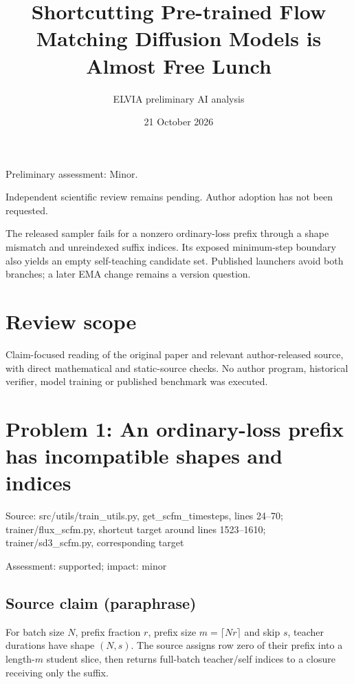 \documentclass[11pt]{article}
\begin{document}
\title{Shortcutting Pre-trained Flow Matching Diffusion Models is Almost Free Lunch}

\author{ELVIA preliminary AI analysis}\date{21 October 2026}\maketitle

Preliminary assessment: Minor.\par

Independent scientific review remains pending. Author adoption has not been requested.

The released sampler fails for a nonzero ordinary-loss prefix through a shape mismatch and unreindexed suffix indices. Its exposed minimum-step boundary also yields an empty self-teaching candidate set. Published launchers avoid both branches; a later EMA change remains a version question.

\section*{Review scope}

Claim-focused reading of the original paper and relevant author-released source, with direct mathematical and static-source checks. No author program, historical verifier, model training or published benchmark was executed.

\section*{Problem 1: An ordinary-loss prefix has incompatible shapes and indices}

Source: src/utils/train\_utils.py, get\_scfm\_timesteps, lines 24–70; trainer/flux\_scfm.py, shortcut target around lines 1523–1610; trainer/sd3\_scfm.py, corresponding target

Assessment: supported; impact: minor

\subsection*{Source claim (paraphrase)}

For batch size \(N\), prefix fraction \(r\), prefix size \(m=\lceil Nr\rceil\) and skip \(s\), teacher durations have shape \((N,s)\). The source assigns row zero of their prefix into a length-\(m\) student slice, then returns full-batch teacher/self indices to a closure receiving only the suffix.
\end{document}
